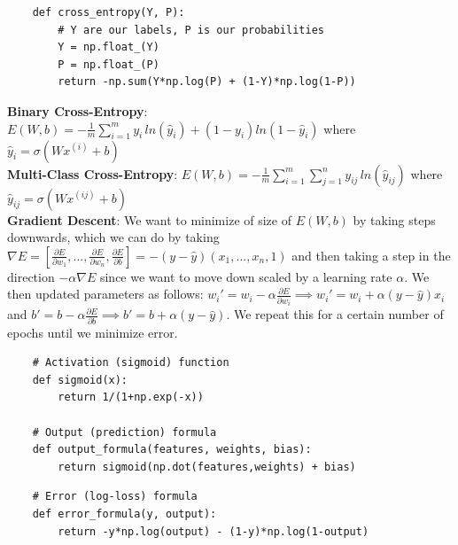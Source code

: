 \documentclass[11pt, a4paper]{article}
\begin{document}
\begin{spacing}{1.1}
	\begin{lstlisting}
	def cross_entropy(Y, P):
		# Y are our labels, P is our probabilities
		Y = np.float_(Y)
		P = np.float_(P)
		return -np.sum(Y*np.log(P) + (1-Y)*np.log(1-P))
	\end{lstlisting} \vspace*{2mm}
	\textbf{Binary Cross-Entropy}: $E(W,b) = -\frac{1}{m} \sum_{i=1}^m y_i\,  ln(\hat{y}_i) + (1-y_i)ln(1-\hat{y}_i)$ where $\hat{y}_i = \sigma(Wx^{(i)}+b)$  \vspace*{2mm}\\
	\textbf{Multi-Class Cross-Entropy}: $E(W,b) = -\frac{1}{m} \sum_{i=1}^m \sum_{j=1}^n y_{ij}\, ln(\hat{y}_{ij})$ where $\hat{y}_{ij} = \sigma(Wx^{(ij)} + b)$  \vspace*{2mm}\\
	\textbf{Gradient Descent}: We want to minimize of size of $E(W,b)$ by taking steps downwards, which we can do by taking $\nabla E = [\frac{\partial E}{\partial w_1},..., \frac{\partial E}{\partial w_n}, \frac{\partial E}{\partial b}] = -(y-\hat{y})(x_1,...,x_n,1)$ and then taking a step in the direction $-\alpha\nabla E$ since we want to move down scaled by a learning rate $\alpha$. We then updated parameters as follows: $w_i' = w_i - \alpha \frac{\partial E}{\partial w_i} \implies w_i' = w_i + \alpha(y-\hat{y})x_i $ and $b' = b - \alpha \frac{\partial E}{\partial b} \implies b' = b + \alpha(y-\hat{y})$. We repeat this for a certain number of epochs until we minimize error. 
	\begin{lstlisting}
	# Activation (sigmoid) function
	def sigmoid(x):
		return 1/(1+np.exp(-x))
	
	# Output (prediction) formula
	def output_formula(features, weights, bias):
		return sigmoid(np.dot(features,weights) + bias)	\end{lstlisting} \newpage
	
	\begin{lstlisting}
	# Error (log-loss) formula
	def error_formula(y, output):
		return -y*np.log(output) - (1-y)*np.log(1-output)
	

\end{lstlisting}
\end{spacing}
\end{document}
